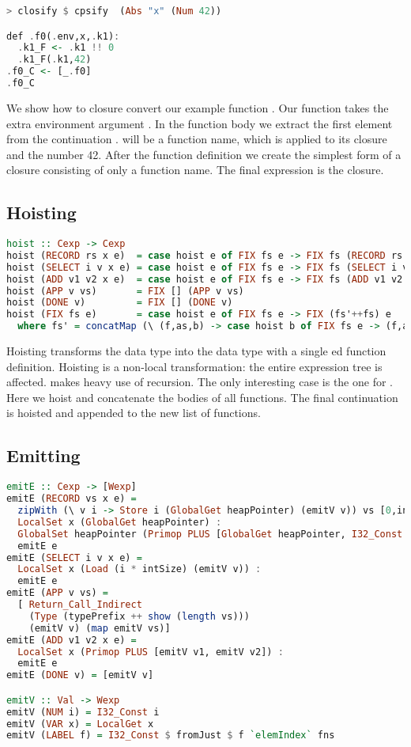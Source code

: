 \begin{lstlisting}[language=Haskell]
> closify $ cpsify  (Abs "x" (Num 42))

def .f0(.env,x,.k1):
  .k1_F <- .k1 !! 0
  .k1_F(.k1,42)
.f0_C <- [_.f0]
.f0_C
\end{lstlisting}

We show how to closure convert our example function . Our function  takes the extra environment argument . In the function body we extract the first element from the continuation .  will be a function name, which is applied to its closure and the number 42. After the function definition we create the simplest form of a closure consisting of only a function name. The final expression is the closure.

\subsection{\label{subsection:hoist}Hoisting}
\begin{lstlisting}[language=Haskell]
hoist :: Cexp -> Cexp
hoist (RECORD rs x e)  = case hoist e of FIX fs e -> FIX fs (RECORD rs x e)
hoist (SELECT i v x e) = case hoist e of FIX fs e -> FIX fs (SELECT i v x e)
hoist (ADD v1 v2 x e)  = case hoist e of FIX fs e -> FIX fs (ADD v1 v2 x e)
hoist (APP v vs)       = FIX [] (APP v vs)
hoist (DONE v)         = FIX [] (DONE v)               
hoist (FIX fs e)       = case hoist e of FIX fs e -> FIX (fs'++fs) e
  where fs' = concatMap (\ (f,as,b) -> case hoist b of FIX fs e -> (f,as,e) : fs) fs
\end{lstlisting}

Hoisting transforms the  data type into the  data type with a single ed function definition. Hoisting is a non-local transformation: the entire expression tree is affected.  makes heavy use of recursion. The only interesting case is the one for . Here we hoist and concatenate the bodies of all functions. The final continuation  is hoisted and appended to the new list of functions.

\subsection{\label{section:emit}Emitting}
\begin{lstlisting}[language=Haskell]
emitE :: Cexp -> [Wexp]
emitE (RECORD vs x e) =
  zipWith (\ v i -> Store i (GlobalGet heapPointer) (emitV v)) vs [0,intSize..] ++
  LocalSet x (GlobalGet heapPointer) :
  GlobalSet heapPointer (Primop PLUS [GlobalGet heapPointer, I32_Const (length vs * intSize)]) :
  emitE e
emitE (SELECT i v x e) =
  LocalSet x (Load (i * intSize) (emitV v)) :
  emitE e
emitE (APP v vs) =
  [ Return_Call_Indirect
    (Type (typePrefix ++ show (length vs)))
    (emitV v) (map emitV vs)]
emitE (ADD v1 v2 x e) =
  LocalSet x (Primop PLUS [emitV v1, emitV v2]) :
  emitE e
emitE (DONE v) = [emitV v]

emitV :: Val -> Wexp
emitV (NUM i) = I32_Const i
emitV (VAR x) = LocalGet x
emitV (LABEL f) = I32_Const $ fromJust $ f `elemIndex` fns
\end{lstlisting}

